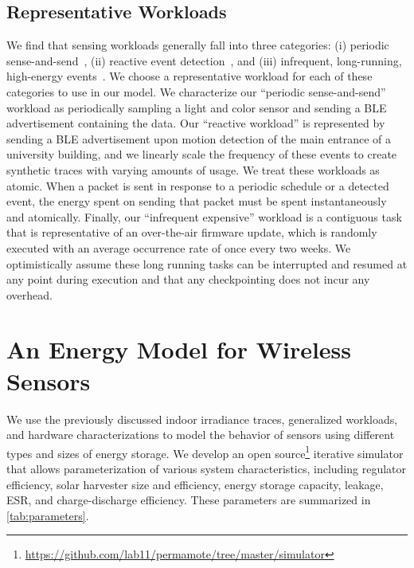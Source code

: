 \subsection{Representative Workloads}
We find that sensing workloads generally fall into three
categories: (i) periodic sense-and-send~\cite{mainwaring2002wireless}, (ii) reactive event detection~\cite{campbellEnergy14,afanasov2020battery}, and (iii) infrequent,
long-running, high-energy events~\cite{levis2004trickle}. We choose a representative workload for each
of these categories to use in our model.
We characterize our ``periodic sense-and-send''
workload as periodically sampling a light and color sensor and sending a
BLE
advertisement containing the data.
Our ``reactive workload'' is
represented by sending a BLE advertisement upon motion detection of the main
entrance of a university building, and we linearly scale the frequency
of these events to create synthetic traces with varying amounts of usage. 
We treat these workloads as atomic. 
When a packet is sent in response to a periodic schedule or a detected event, the energy spent on sending that packet must be spent instantaneously and atomically.  
Finally, our ``infrequent expensive'' workload is a
contiguous
task that is representative of an
over-the-air firmware update, which is randomly executed with an average occurrence rate
of once every two weeks.
We optimistically assume these long running tasks can be interrupted
and resumed at any point during execution and that any checkpointing does not incur any overhead.


\section{An Energy Model for Wireless Sensors}
We use the previously discussed indoor irradiance traces, generalized
workloads, and hardware characterizations to model the behavior of sensors
using different types and sizes of energy storage. We develop an open
source\footnote{\url{https://github.com/lab11/permamote/tree/master/simulator}}
iterative simulator that allows parameterization of various system
characteristics, including regulator efficiency, solar harvester size
and efficiency, energy storage capacity, leakage, ESR, and charge-discharge
efficiency. These parameters are summarized in \cref{tab:parameters}.

